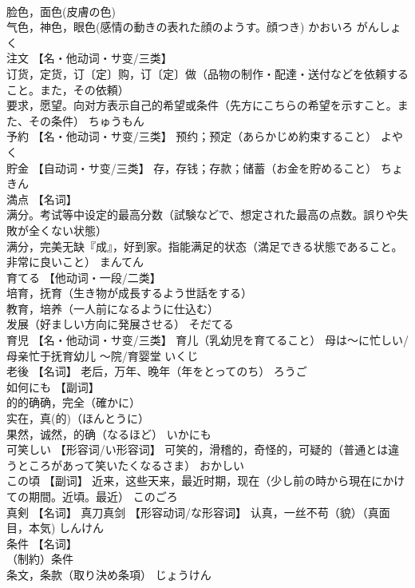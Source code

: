 \documentclass[8pt]{extreport}
\begin{document}
\begin{CJK}{UTF8}{min}
\\	脸色，面色(皮膚の色) 
\\	气色，神色，眼色(感情の動きの表れた顔のようす。顔つき)	かおいろ がんしょく	
\\	注文	【名・他动词・サ变/三类】 
\\	订货，定货，订〔定〕购，订〔定〕做（品物の制作・配達・送付などを依頼すること。また，その依頼） 
\\	要求，愿望。向对方表示自己的希望或条件（先方にこちらの希望を示すこと。また、その条件）	ちゅうもん	
\\	予約	【名・他动词・サ变/三类】 预约；预定（あらかじめ約束すること）	よやく	
\\	貯金	【自动词・サ变/三类】 存，存钱；存款；储蓄（お金を貯めること）	ちょきん	
\\	満点	【名词】 
\\	满分。考试等中设定的最高分数（試験などで、想定された最高の点数。誤りや失敗が全くない状態） 
\\	满分，完美无缺『成』，好到家。指能满足的状态（満足できる状態であること。非常に良いこと）	まんてん	
\\	育てる	【他动词・一段/二类】 
\\	培育，抚育（生き物が成長するよう世話をする） 
\\	教育，培养（一人前になるように仕込む） 
\\	发展（好ましい方向に発展させる）	そだてる	
\\	育児	【名・他动词・サ变/三类】 育儿（乳幼児を育てること） 母は～に忙しい/母亲忙于抚育幼儿 ～院/育婴堂	いくじ	
\\	老後	【名词】 老后，万年、晚年（年をとってのち）	ろうご	
\\	如何にも	【副词】 
\\	的的确确，完全（確かに） 
\\	实在，真(的)（ほんとうに） 
\\	果然，诚然，的确（なるほど）	いかにも	
\\	可笑しい	【形容词/い形容词】 可笑的，滑稽的，奇怪的，可疑的（普通とは違うところがあって笑いたくなるさま）	おかしい	
\\	この頃	【副词】 近来，这些天来，最近时期，现在（少し前の時から現在にかけての期間。近頃。最近）	このごろ	
\\	真剣	【名词】 真刀真剑 【形容动词/な形容词】 认真，一丝不苟（貌）（真面目，本気)	しんけん	
\\	条件	【名词】 
\\	（制約）条件 
\\	条文，条款（取り決め条項）	じょうけん	

\end{CJK}
\end{document}
